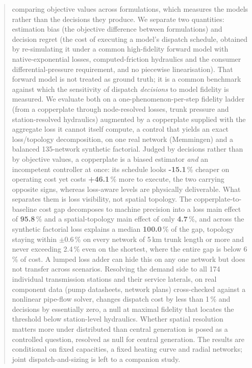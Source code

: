 \documentclass[a4paper,fleqn]{cas-sc}
\begin{document}
\begin{abstract}
comparing objective values across formulations, which measures the models rather than
the decisions they produce. We separate two quantities: estimation bias (the objective
difference between formulations) and decision regret (the cost of executing a model's
dispatch schedule, obtained by re-simulating it under a common high-fidelity forward
model with native-exponential losses, computed-friction hydraulics and the consumer
differential-pressure requirement, and no piecewise linearisation). That forward model is
not treated as ground truth; it is a common benchmark against which the sensitivity of
dispatch \emph{decisions} to model fidelity is measured. We evaluate both on
a one-phenomenon-per-step fidelity ladder (from a copperplate through node-resolved
losses, trunk pressure and station-resolved hydraulics) augmented by a copperplate
supplied with the aggregate loss it cannot itself compute, a control that yields an
exact loss/topology decomposition, on one real network (Memmingen) and a balanced
135-network synthetic factorial. Judged by decisions rather than by objective values, a
copperplate is a biased estimator \emph{and} an incompetent controller at once: its
schedule looks \textbf{-15.1}\,\% cheaper on operating cost yet costs
\textbf{+46.1}\,\% more to execute, the two carrying opposite signs, whereas
loss-aware levels are physically deliverable. What separates them is loss visibility, not
spatial topology. The copperplate-to-baseline cost gap decomposes to machine precision into
a loss main effect of \textbf{95.8}\,\% and a spatial-topology main effect of only
\textbf{4.7}\,\%, and across the synthetic factorial loss explains a median
\textbf{100.0}\,\% of the gap, topology staying within
$\pm$0.6\,\% on every network of 5\,km trunk length or more and never exceeding 2.4\,\% even
on the shortest, where the entire gap is below 6\,\% of cost. A lumped loss adder can hide
this on any one network but does not transfer across scenarios. Resolving the demand side to all 174
individual transmission stations and their service laterals, on real component data (pump
datasheets, network plans) cross-checked against a nonlinear pipe-flow solver, changes
dispatch cost by less than 1\,\% and decisions by essentially zero, a null at maximal
fidelity that locates the threshold below station-level hydraulics. Whether spatial
resolution matters more under distributed than central generation is posed as a controlled
question, resolved as null for central generation. The results are conditional on fixed
capacities, a fixed heating curve and radial networks; joint dispatch-and-sizing is left
to a companion study.
\end{abstract}
\end{document}
